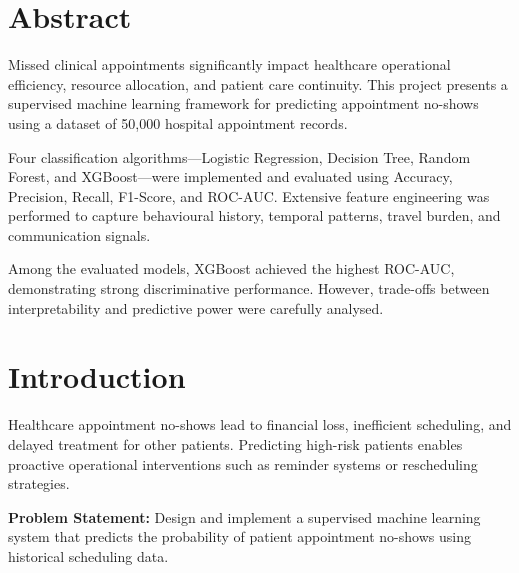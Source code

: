 \documentclass[12pt, a4paper]{report}
\begin{document}
\cleardoublepage
\thispagestyle{plain}
\chapter*{Abstract}

Missed clinical appointments significantly impact healthcare operational
efficiency, resource allocation, and patient care continuity. This project
presents a supervised machine learning framework for predicting appointment
no-shows using a dataset of 50{,}000 hospital appointment records.

Four classification algorithms---Logistic Regression, Decision Tree, Random
Forest, and XGBoost---were implemented and evaluated using Accuracy, Precision,
Recall, F1-Score, and ROC-AUC\@. Extensive feature engineering was performed
to capture behavioural history, temporal patterns, travel burden, and
communication signals.

Among the evaluated models, XGBoost achieved the highest ROC-AUC,
demonstrating strong discriminative performance. However, trade-offs between
interpretability and predictive power were carefully analysed.

\cleardoublepage
\tableofcontents

\chapter{Introduction}

Healthcare appointment no-shows lead to financial loss, inefficient scheduling,
and delayed treatment for other patients. Predicting high-risk patients enables
proactive operational interventions such as reminder systems or rescheduling
strategies.

\vspace{0.6cm}
\begin{problembox}
  \textbf{Problem Statement:} Design and implement a supervised machine
  learning system that predicts the probability of patient appointment no-shows
  using historical scheduling data.
\end{problembox}
\vspace{0.4cm}
\end{document}
